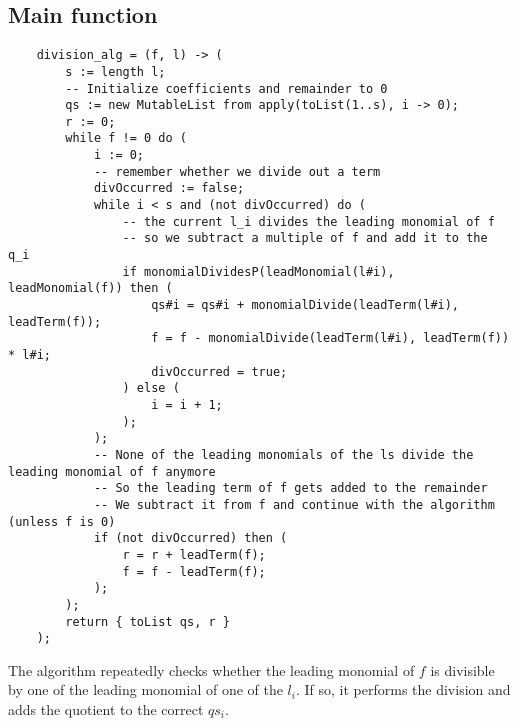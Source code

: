 \documentclass[a4paper,article,math]{extarticle}
\begin{document}
\subsection{Main function}
\begin{lstlisting}
	division_alg = (f, l) -> (
		s := length l;
		-- Initialize coefficients and remainder to 0
		qs := new MutableList from apply(toList(1..s), i -> 0);
		r := 0;
		while f != 0 do (
			i := 0;
			-- remember whether we divide out a term
			divOccurred := false;
			while i < s and (not divOccurred) do (
				-- the current l_i divides the leading monomial of f
				-- so we subtract a multiple of f and add it to the q_i
				if monomialDividesP(leadMonomial(l#i), leadMonomial(f)) then (
					qs#i = qs#i + monomialDivide(leadTerm(l#i), leadTerm(f));
					f = f - monomialDivide(leadTerm(l#i), leadTerm(f)) * l#i;
					divOccurred = true;
				) else (
					i = i + 1;
				);
			);
			-- None of the leading monomials of the ls divide the leading monomial of f anymore
			-- So the leading term of f gets added to the remainder
			-- We subtract it from f and continue with the algorithm (unless f is 0)
			if (not divOccurred) then (
				r = r + leadTerm(f);
				f = f - leadTerm(f);
			);
		);
		return { toList qs, r }
	);
\end{lstlisting}
The algorithm repeatedly checks whether the leading monomial of $f$ is divisible by one of the leading monomial
of one of the $l_i$. If so, it performs the division and adds the quotient to the correct $qs_i$.
\nocite{*}


\end{document}
